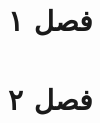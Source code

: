 \documentclass[a4paper,12pt]{book}
\begin{document}
\cleardoublepage
{} 







\tableofcontents
\clearpage
\listoffigures
\clearpage
\chapter{فصل ۱}

\clearpage
\chapter{فصل ۲}


 


\end{document}
